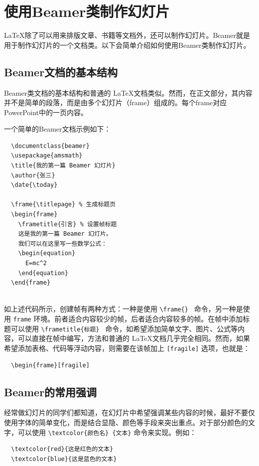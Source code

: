 \section{使用Beamer类制作幻灯片}

LaTeX除了可以用来排版文章、书籍等文档外，还可以制作幻灯片。Beamer就是用于制作幻灯片的一个文档类。以下会简单介绍如何使用Beamer类制作幻灯片。

\subsection{Beamer文档的基本结构}

Beamer类文档的基本结构和普通的 \LaTeX 文档类似。然而，在正文部分，其内容并不是简单的段落，而是由多个幻灯片（frame）组成的。每个frame对应PowerPoint中的一页内容。

一个简单的Beamer文档示例如下：
\begin{verbatim}
  \documentclass{beamer}
  \usepackage{amsmath}
  \title{我的第一篇 Beamer 幻灯片}
  \author{张三}
  \date{\today}
  
  \frame{\titlepage} % 生成标题页
  \begin{frame}
    \frametitle{引言} % 设置帧标题
    这是我的第一篇 Beamer 幻灯片。
    我们可以在这里写一些数学公式：
    \begin{equation}
      E=mc^2
    \end{equation}
  \end{frame}
  
\end{verbatim}

如上述代码所示，创建帧有两种方式：一种是使用  \texttt{\textbackslash frame\{\} } 命令，另一种是使用  \texttt{frame}  环境。前者适合内容较少的帧，后者适合内容较多的帧。在帧中添加标题可以使用  \texttt{\textbackslash frametitle\{标题\} } 命令，如希望添加简单文字、图片、公式等内容，可以直接在帧中编写，方法和普通的  \LaTeX  文档几乎完全相同。然而，如果希望添加表格、代码等浮动内容，则需要在该帧加上  \texttt{[fragile]}  选项，也就是：
\begin{verbatim}
  \begin{frame}[fragile]
\end{verbatim}

\subsection{Beamer的常用强调}

经常做幻灯片的同学们都知道，在幻灯片中希望强调某些内容的时候，最好不要仅使用字体的简单变化，而是结合显隐、颜色等手段来突出重点。对于部分颜色的文字，可以使用  \texttt{\textbackslash textcolor\{颜色名\} \{文本\}} 命令来实现。例如：
\begin{verbatim}
  \textcolor{red}{这是红色的文本}
  \textcolor{blue}{这是蓝色的文本}
\end{verbatim}

